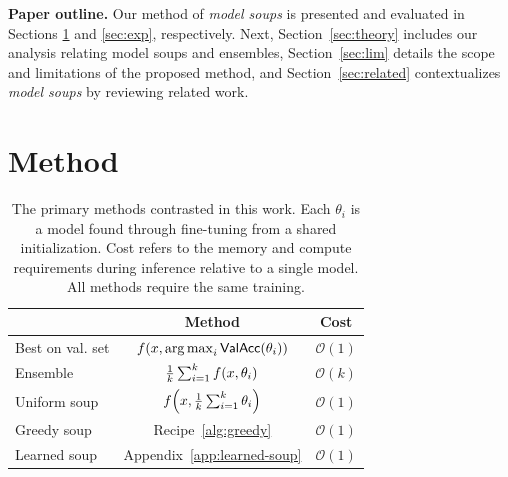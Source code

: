 \documentclass[nohyperref]{article}
\DeclareMathOperator*{\argmax}{arg\,max}
\theoremstyle{plain}
\theoremstyle{definition}
\theoremstyle{remark}
\begin{document}
        \textbf{Paper outline.} Our method of \emph{model soups} is presented and evaluated in Sections \ref{sec:method} and \ref{sec:exp}, respectively.
        Next, Section~\ref{sec:theory} includes our analysis relating model soups and ensembles, Section~\ref{sec:lim} details the scope and limitations of the proposed method, and Section~\ref{sec:related} contextualizes \emph{model soups} by reviewing related work.
        
        
    
        \section{Method} \label{sec:method}
        \begin{table}
        \renewcommand{\arraystretch}{1.15}
            \caption{The primary methods contrasted in this work.
            Each $\theta_i$ is a model found through fine-tuning from 
            a shared initialization.
            Cost refers to the memory and compute requirements during inference
            relative to a single model. 
            All methods require the same training.}
            \vspace*{-0.2cm}
            \begin{center}
                \begin{tabular}{lcc} 
                \toprule
                 & Method & Cost \\
                 \midrule
                 Best on val. set & $f\mleft(x, \argmax_{i} \mathsf{ValAcc}\mleft(\theta_i\mright) \mright)$  & $\mathcal{O}(1)$  \\
                 Ensemble & $\frac{1}{k}\sum_{i=1}^k f\mleft(x, \theta_i\mright)$ & $\mathcal{O}(k)$ \\ %
                 Uniform soup & $f\mleft(x,  \frac{1}{k}\sum_{i=1}^k \theta_i\mright)$ & $\mathcal{O}(1)$  \\
                 Greedy soup & Recipe~\ref{alg:greedy} & $\mathcal{O}(1)$  \\ 
                 Learned soup & Appendix~\ref{app:learned-soup} & $\mathcal{O}(1)$  \\  
                 \bottomrule
                \end{tabular}
            \end{center}
            \label{tab:methods}
            \vspace*{-0.4cm}
        \end{table}
        
\end{document}
